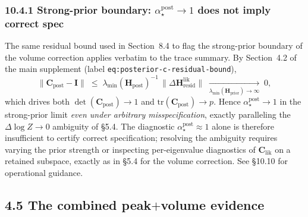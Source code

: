 \documentclass[11pt]{article}
\begin{document}
\subsubsection*{10.4.1 Strong-prior boundary: $\alpha_\star^{\mathrm{post}} \to 1$ does not imply correct spec}

The same residual bound used in Section~8.4 to flag the strong-prior boundary
of the volume correction applies verbatim to the trace summary. By Section~4.2
of the main supplement (label
\texttt{eq:posterior-c-residual-bound}),
\[
\|\mathbf C_{\mathrm{post}} - \mathbf I\|
\;\le\;
\lambda_{\min}(\mathbf H_{\mathrm{post}})^{-1}\,
\|\Delta\mathbf{H}^{\mathrm{lik}}_{\mathrm{resid}}\|
\;\xrightarrow[\lambda_{\min}(\mathbf H_{\mathrm{prior}})\to\infty]{}\;
0,
\]
which drives both $\det(\mathbf C_{\mathrm{post}}) \to 1$ and
$\mathrm{tr}(\mathbf C_{\mathrm{post}}) \to p$. Hence $\alpha_\star^{\mathrm{post}}
\to 1$ in the strong-prior limit \emph{even under arbitrary misspecification},
exactly paralleling the $\Delta\log Z \to 0$ ambiguity of \S5.4. The diagnostic
$\alpha_\star^{\mathrm{post}} \approx 1$ alone is therefore insufficient to
certify correct specification; resolving the ambiguity requires varying the
prior strength or inspecting per-eigenvalue diagnostics of
$\mathbf C_{\mathrm{lik}}$ on a retained subspace, exactly as in \S5.4 for the
volume correction. See \S10.10 for operational guidance.

\subsection*{4.5 The combined peak$+$volume evidence}
\end{document}
